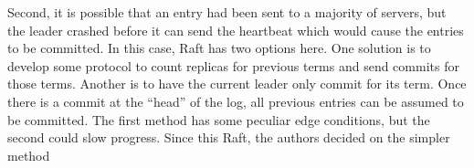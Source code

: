 Second, it is possible that an entry had been sent to a majority of servers, but the leader crashed before it can send the heartbeat which would cause the entries to be committed.
In this case, Raft has two options here.
One solution is to develop some protocol to count replicas for previous terms and send commits for those terms.
Another is to have the current leader only commit for its term.
Once there is a commit at the ``head'' of the log, all previous entries can be assumed to be committed.
The first method has some peculiar edge conditions, but the second could slow progress.
Since this Raft, the authors decided on the simpler method










\newpage





\appendix

%






